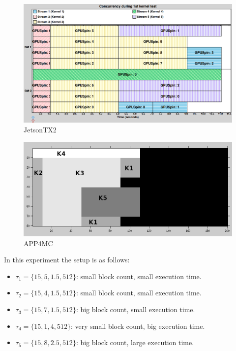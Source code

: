 \documentclass[
  12pt,
  a4paperpaper,
]{report}
\providecommand{\tightlist}{%
  \setlength{\itemsep}{0pt}\setlength{\parskip}{0pt}}
\begin{document}
\begin{figure}
\centering
\includegraphics[width=1\textwidth,height=\textheight]{source/figures/nvidia/ex06.png}
\caption{JetsonTX2 \label{img:nvidia-ex06}}
\end{figure}

\begin{figure}
\centering
\includegraphics[width=1\textwidth,height=\textheight]{source/figures/octave/ex06.png}
\caption{APP4MC \label{img:octave-ex06}}
\end{figure}

In this experiment the setup is as follows:

\begin{itemize}
\tightlist
\item
  \(\tau_1 = \{15,5,1.5,512\}\): small block count, small execution
  time.
\item
  \(\tau_2 = \{15,4,1.5,512\}\): small block count, small execution
  time.
\item
  \(\tau_3 = \{15,7,1.5,512\}\): big block count, small execution time.
\item
  \(\tau_4 =\{ 15, 1,4,512\}\): very small block count, big execution
  time.
\item
  \(\tau_5 = \{15,8,2.5,512\}\): big block count, large execution time.
\end{itemize}
\end{document}
